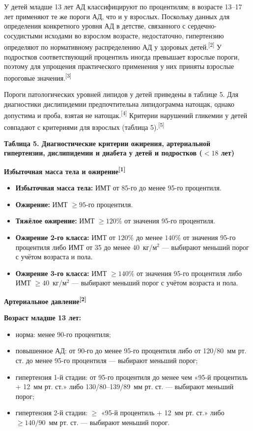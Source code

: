 \documentclass[11pt,a4paper]{article}
\newcommand{\src}[1]{\textsuperscript{[#1]}}
\newcommand{\heading}[1]{\par\medskip\textbf{#1}\par}
\begin{document}
У детей младше 13 лет АД классифицируют по процентилям; в возрасте 13--17 лет применяют те же пороги АД, что и у взрослых. Поскольку данных для определения конкретного уровня АД в детстве, связанного с сердечно-сосудистыми исходами во взрослом возрасте, недостаточно, гипертензию определяют по нормативному распределению АД у здоровых детей.\src{2} У подростков соответствующий процентиль иногда превышает взрослые пороги, поэтому для упрощения практического применения у них приняты взрослые пороговые значения.\src{3}

Пороги патологических уровней липидов у детей приведены в таблице 5. Для диагностики дислипидемии предпочтительна липидограмма натощак, однако допустима и проба, взятая не натощак.\src{4} Критерии нарушений гликемии у детей совпадают с критериями для взрослых (таблица 5).\src{5}

\heading{Таблица 5. Диагностические критерии ожирения, артериальной гипертензии, дислипидемии и диабета у детей и подростков ($<18$ лет)}
\heading{Избыточная масса тела и ожирение\src{1}}
\begin{itemize}
\item \textbf{Избыточная масса тела:} ИМТ от 85-го до менее 95-го процентиля.
\item \textbf{Ожирение:} ИМТ $\geq95$-го процентиля.
\item \textbf{Тяжёлое ожирение:} ИМТ $\geq120\%$ от значения 95-го процентиля.
\item \textbf{Ожирение 2-го класса:} ИМТ от $120\%$ до менее $140\%$ от значения 95-го процентиля либо ИМТ от 35 до менее 40~кг/м$^2$ --- выбирают меньший порог с учётом возраста и пола.
\item \textbf{Ожирение 3-го класса:} ИМТ $\geq140\%$ от значения 95-го процентиля либо ИМТ $\geq40$~кг/м$^2$ --- выбирают меньший порог с учётом возраста и пола.
\end{itemize}

\heading{Артериальное давление\src{2}}
\textbf{Возраст младше 13 лет:}
\begin{itemize}
\item норма: менее 90-го процентиля;
\item повышенное АД: от 90-го до менее 95-го процентиля либо от 120/80~мм рт. ст. до менее 95-го процентиля --- выбирают меньший порог;
\item гипертензия 1-й стадии: от 95-го процентиля до менее чем «95-й процентиль + 12~мм рт. ст.» либо 130/80--139/89~мм рт. ст. --- выбирают меньший порог;
\item гипертензия 2-й стадии: $\geq$ «95-й процентиль + 12~мм рт. ст.» либо $\geq140/90$~мм рт. ст. --- выбирают меньший порог.
\end{itemize}
\end{document}
